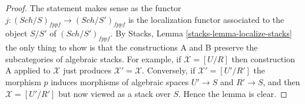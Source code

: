 \documentclass{stacks-project}
\theoremstyle{plain}
\theoremstyle{definition}
\theoremstyle{remark}
\numberwithin{equation}{subsection}
\def\Sch{\mathit{Sch}}
\begin{document}
\begin{proof}
The statement makes sense as the functor
$j : (\Sch/S)_{fppf} \to (\Sch/S')_{fppf}$
is the localization functor associated to the object $S/S'$
of $(\Sch/S')_{fppf}$. By
Stacks, Lemma \ref{stacks-lemma-localize-stacks}
the only thing to show is that the constructions A and B
preserve the subcategories of algebraic stacks.
For example, if $\mathcal{X} = [U/R]$ then construction A
applied to $\mathcal{X}$ just produces
$\mathcal{X}' = \mathcal{X}$. Conversely, if $\mathcal{X}' = [U'/R']$
the morphism $p$ induces morphisms of algebraic spaces
$U' \to S$ and $R' \to S$, and then $\mathcal{X} = [U'/R']$
but now viewed as a stack over $S$. Hence the lemma is clear.
\end{proof}
\end{document}
